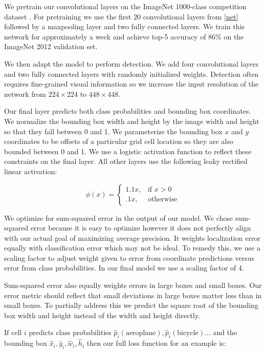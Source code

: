 \documentclass{article} %
\begin{document}
We pretrain our convolutional layers on the ImageNet 1000-class competition dataset \cite{ILSVRC15}. For pretraining we use the first 20 convolutional layers from \ref{net} followed by a maxpooling layer and two fully connected layers. We train this network for approximately a week and achieve top-5 accuracy of 86\% on the ImageNet 2012 validation set.

We then adapt the model to perform detection. We add four convolutional layers and two fully connected layers with randomly initialized weights. Detection often requires fine-grained visual information so we increase the input resolution of the network from $224 \times 224$ to $448 \times 448$.

Our final layer predicts both class probabilities and bounding box coordinates. We normalize the bounding box width and height by the image width and height so that they fall between 0 and 1. We parameterize the bounding box $x$ and $y$ coordinates to be offsets of a particular grid cell location so they are also bounded between 0 and 1. We use a logistic activation function to reflect these constraints on the final layer. All other layers use the following leaky rectified linear activation:

\begin{equation}
\phi(x) =
\begin{cases}
    1.1x, & \text{if } x > 0\\
    .1x, & \text{otherwise}
    \end{cases}
\end{equation}

We optimize for sum-squared error in the output of our model. We chose sum-squared error because it is easy to optimize however it does not perfectly align with our actual goal of maximizing average precision. It weights localization error equally with classification error which may not be ideal. To remedy this, we use a scaling factor to adjust weight given to error from coordinate predictions versus error from class probabilities. In our final model we use a scaling factor of 4.

Sum-squared error also equally weights errors in large boxes and small boxes. Our error metric should reflect that small deviations in large boxes matter less than in small boxes. To partially address this we predict the square root of the bounding box width and height instead of the width and height directly.

If cell $i$ predicts class probabilities $\hat{p}_i(\text{aeroplane}), \hat{p}_i(\text{bicycle})...$ and the bounding box $\hat{x}_i,\hat{y}_i, \hat{w}_i, \hat{h}_i$ then our full loss function for an example is:
\end{document}

